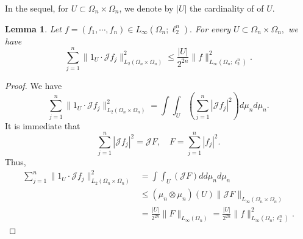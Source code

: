 \documentclass{amsart}
\numberwithin{equation}{section}
\newtheorem{lem}[thm]{Lemma}
\theoremstyle{definition}
\theoremstyle{remark}
\newcommand{\1}{\mathbf 1}
\begin{document}
In the sequel, for $U\subset\Omega_n\times\Omega_n$, we denote by $|U|$  the cardinality of of $U$. 
\begin{lem}\label{getting rid of U lemma}
	Let $f=(f_1,\cdots,f_n)\in L_{\infty}(\Omega_n;\ell^n_2).$
	 For every $U\subset\Omega_n\times\Omega_n,$ we have
$$\sum_{j=1}^n\|1_U\cdot \mathcal{J}f_j\|_{L_2(\Omega_n\times\Omega_n)}^2\leq\frac{|U|}{2^{2n}}\|f\|_{L_{\infty}(\Omega_n;\ell^n_2)}^2.$$
\end{lem}
\begin{proof} We have
$$\sum_{j=1}^n\|1_U\cdot \mathcal{J}f_j\|_{L_2(\Omega_n\times\Omega_n)}^2=\int\int_U(\sum_{j=1}^n|\mathcal{J}f_j|^2)d\mu_n d\mu_n.$$
It is immediate that
$$\sum_{j=1}^n|\mathcal{J}f_j|^2=\mathcal{J}F,\quad F=\sum_{j=1}^n|f_j|^2.$$
Thus,
\begin{align*}
\sum_{j=1}^n\|1_U\cdot \mathcal{J}f_j\|_{L_2(\Omega_n\times\Omega_n)}^2&=\int\int_U(\mathcal{J}F)dd\mu_n d\mu_n\\
&\leq  (\mu_n\otimes \mu_n)(U)\|\mathcal{J}F\|_{L_{\infty}(\Omega_n\times\Omega_n)}\\
&=\frac{|U|}{2^{2n}}\|F\|_{L_{\infty}(\Omega_n)}=\frac{|U|}{2^{2n}}\|f\|_{L_{\infty}(\Omega_n;\ell^n_2)}^2.
\end{align*}
\end{proof}
\end{document}
